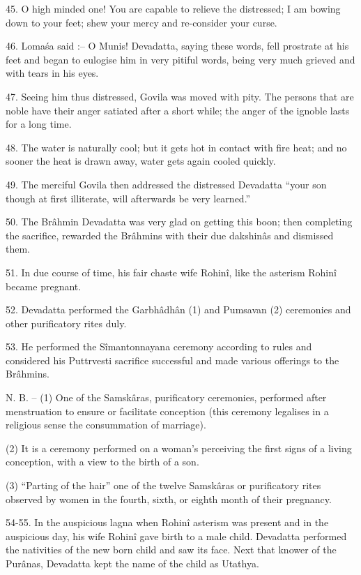 45. O high minded one! You are capable to relieve the distressed; I am bowing down to your feet; shew your mercy and re-consider your curse.

46. Loma\'sa said :-- O Munis! Devadatta, saying these words, fell prostrate at his feet and began to eulogise him in very pitiful words, being very much grieved and with tears in his eyes.

47. Seeing him thus distressed, Govila was moved with pity. The persons that are noble have their anger satiated after a short while; the anger of the ignoble lasts for a long time.

48. The water is naturally cool; but it gets hot in contact with fire heat; and no sooner the heat is drawn away, water gets again cooled quickly.

49. The merciful Govila then addressed the distressed Devadatta ``your son though at first illiterate, will afterwards be very learned.''

50. The Br\^ahmin Devadatta was very glad on getting this boon; then completing the sacrifice, rewarded the Br\^ahmins with their due dakshin\^as and dismissed them.

51. In due course of time, his fair chaste wife Rohin\^i, like the asterism Rohin\^i became pregnant.

52. Devadatta performed the Garbh\^adh\^an (1) and Pumsavan (2) ceremonies and other purificatory rites duly.

53. He performed the S\^imantonnayana ceremony according to rules and considered his Puttrvesti sacrifice successful and made various offerings to the Br\^ahmins.

N. B. -- (1) One of the Samsk\^aras, purificatory ceremonies, performed after menstruation to ensure or facilitate conception (this ceremony legalises in a religious sense the consummation of marriage).

(2) It is a ceremony performed on a woman's perceiving the first signs of a living conception, with a view to the birth of a son.

(3) ``Parting of the hair'' one of the twelve Samsk\^aras or purificatory rites observed by women in the fourth, sixth, or eighth month of their pregnancy.

54-55. In the auspicious lagna when Rohin\^i asterism was present and in the auspicious day, his wife Rohin\^i gave birth to a male child. Devadatta performed the nativities of the new born child and saw its face. Next that knower of the Pur\^anas, Devadatta kept the name of the child as Utathya.

